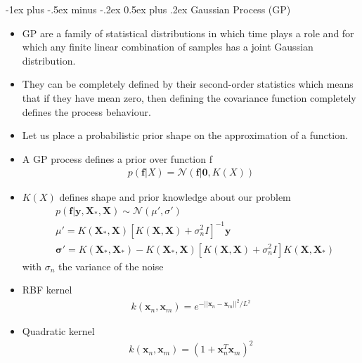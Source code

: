 \documentclass[10pt,a4paper,landscape]{article}
\makeatletter
\renewcommand{\section}{\@startsection{section}{1}{0mm}%
                                {-1ex plus -.5ex minus -.2ex}%
                                {0.5ex plus .2ex}%
                                {\normalfont\large\bfseries}}
\def\*#1{\mathbf{#1}}
\def\N{\mathcal{N}}
\makeatother
\begin{document}
\begin{multicols*}{2}
\section{Gaussian Process (GP)}
\begin{itemize}
    \item GP are a family of statistical distributions in which time plays a role and for which any finite linear combination of samples has a joint Gaussian distribution.
    \item They can be completely defined by their second-order statistics which means that if they have mean zero, then defining the covariance function completely defines the process behaviour.
    \item Let us place a probabilistic prior shape on the approximation of a function.
    \item A GP process defines a prior over function f
    \begin{align*}
        p(\*f | X) = \N(\*f | \*0, K(X))
    \end{align*}
    \item $K(X)$ defines shape and prior knowledge about our problem
    \begin{align*}
        &p(\*f | \*y, \*X_*, \*X) \sim \N(\mu', \sigma')\\
        & \mu' = K(\*X_*, \*X)[K(\*X,\*X) + \sigma_n^2 I]^{-1}\*y\\
        & \*\sigma' = K(\*X_*, \*X_*) - K(\*X_*, \*X)[K(\*X, \*X) + \sigma_n^2 I] K(\*X, \*X_*)
    \end{align*}
    with $\sigma_n$ the variance of the noise
    \item RBF kernel
    \begin{align*}
         k(\*x_n, \*x_m) = e^{-|| \*x_n - \*x_m||^2 / L^2}
     \end{align*} 
     \item Quadratic kernel 
     \begin{align*}
         k(\*x_n, \*x_m) = (1 + \*x_n^T \*x_m)^2
     \end{align*}
\end{itemize}


\end{multicols*}
\end{document}
